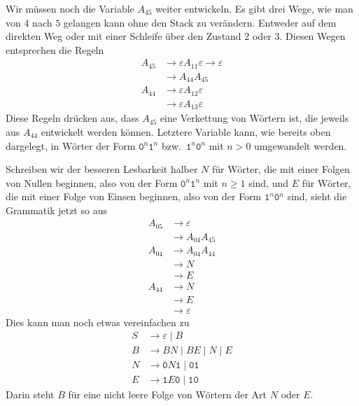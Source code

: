 \begin{loesung}
Wir müssen noch die Variable $A_{45}$ weiter entwickeln. Es gibt
drei Wege, wie man von $4$ nach $5$ gelangen kann ohne den
Stack zu verändern. Entweder auf dem direkten Weg oder mit
einer Schleife über den Zustand $2$ oder $3$.
Diesen Wegen entsprechen die Regeln
\begin{align*}
A_{45}&\to\varepsilon A_{11}\varepsilon\to\varepsilon\\
      &\to A_{44}A_{45}\\
A_{44}&\to\varepsilon A_{12}\varepsilon\\
      &\to\varepsilon A_{13}\varepsilon
\end{align*}
Diese Regeln drücken aus, dass $A_{45}$ eine Verkettung von Wörtern
ist, die jeweils aus $A_{44}$ entwickelt werden können.
Letztere Variable kann, wie bereits oben dargelegt,
in Wörter der Form $\texttt{0}^n\texttt{1}^n$ bzw.~$\texttt{1}^n\texttt{0}^n$
mit $n>0$ umgewandelt werden.

Schreiben wir der besseren Lesbarkeit halber $N$ für Wörter, die mit
einer Folgen von Nullen beginnen, also von der
Form $\texttt{0}^n\texttt{1}^n$ mit $n\ge 1$ sind, und $E$ für Wörter,
die mit einer Folge von Einsen beginnen, also von der
Form $\texttt{1}^n\texttt{0}^n$ sind, sieht die Grammatik jetzt so aus
\begin{align*}
A_{05}&\to\varepsilon \\
      &\to A_{04}A_{45} \\
A_{04}&\to A_{04}A_{44} \\
      &\to N \\
      &\to E \\
A_{44}&\to N \\
      &\to E \\
      &\to \varepsilon
\end{align*}
Dies kann man noch etwas vereinfachen zu
\begin{align*}
S&\to \varepsilon\;|\; B\\
B&\to BN\;|\;BE\;|\;N\;|\;E\\
N&\to \texttt{0}N\texttt{1}\;|\; \texttt{01}\\
E&\to \texttt{1}E\texttt{0}\;|\; \texttt{10}
\end{align*}
Darin steht $B$ für eine nicht leere Folge von Wörtern der Art $N$
oder $E$.
\end{loesung}


